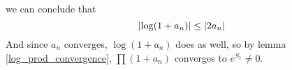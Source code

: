 \documentclass{homework}
\begin{document}
\begin{solution}
\[                                                                                                                                      \]
                                                                                                                                      we can conclude that 
                                                                                                                                      \[
                                                                                                                                      \left|\log(1 + a_n)\right|\leq \left|2a_n\right|
                                                                                                                                      \]
                                                                                                                                      And since $a_n$ converges, $\log(1 + a_n)$ does as well, so by lemma \ref{log_prod_convergence}, $\prod(1+a_n)$ converges to $e^{S_1}\neq 0$.

                                                                                                                                      \end{solution}
\end{document}
